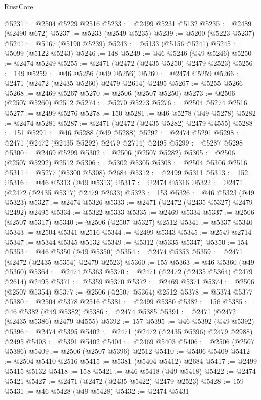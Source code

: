 \begin{lexlean}{RustCore}
\begin{coremodule}
@5231 := @2504 @5229 @2516
@5233 := @2499 @5231 @5132
@5235 := @2489 (@2490 @672)
@5237 := @5233 (@2549 @5235)
@5239 := @5200 (@5223 @5237)
@5241 := @5167 (@5190 @5239)
@5243 := @5133 (@5156 @5241)
@5245 := @5099 (@5122 @5243)
@5246 := 148
@5249 := @46 @5246 (@49 @5246)
@5250 := @2474 @5249
@5255 := @2471 (@2472 (@2435 @5250) @2479 @2523)
@5256 := 149
@5259 := @46 @5256 (@49 @5256)
@5260 := @2474 @5259
@5266 := @2471 (@2472 (@2435 @5260) @2479 @2614) @2495
@5267 := @5255 @5266
@5268 := @2469 @5267
@5270 := @2506 (@2507 @5250)
@5273 := @2506 (@2507 @5260) @2512
@5274 := @5270 @5273
@5276 := @2504 @5274 @2516
@5277 := @2499 @5276
@5278 := 150
@5281 := @46 @5278 (@49 @5278)
@5282 := @2474 @5281
@5287 := @2471 (@2472 (@2435 @5282) @2479 @4555)
@5288 := 151
@5291 := @46 @5288 (@49 @5288)
@5292 := @2474 @5291
@5298 := @2471 (@2472 (@2435 @5292) @2479 @2714) @2495
@5299 := @5287 @5298
@5300 := @2469 @5299
@5302 := @2506 (@2507 @5282)
@5305 := @2506 (@2507 @5292) @2512
@5306 := @5302 @5305
@5308 := @2504 @5306 @2516
@5311 := @5277 (@5300 @5308) @2684
@5312 := @2499 @5311
@5313 := 152
@5316 := @46 @5313 (@49 @5313)
@5317 := @2474 @5316
@5322 := @2471 (@2472 (@2435 @5317) @2479 @2633)
@5323 := 153
@5326 := @46 @5323 (@49 @5323)
@5327 := @2474 @5326
@5333 := @2471 (@2472 (@2435 @5327) @2479 @2492) @2495
@5334 := @5322 @5333
@5335 := @2469 @5334
@5337 := @2506 (@2507 @5317)
@5340 := @2506 (@2507 @5327) @2512
@5341 := @5337 @5340
@5343 := @2504 @5341 @2516
@5344 := @2499 @5343
@5345 := @2549 @2714
@5347 := @5344 @5345 @5132
@5349 := @5312 (@5335 @5347)
@5350 := 154
@5353 := @46 @5350 (@49 @5350)
@5354 := @2474 @5353
@5359 := @2471 (@2472 (@2435 @5354) @2479 @2523)
@5360 := 155
@5363 := @46 @5360 (@49 @5360)
@5364 := @2474 @5363
@5370 := @2471 (@2472 (@2435 @5364) @2479 @2614) @2495
@5371 := @5359 @5370
@5372 := @2469 @5371
@5374 := @2506 (@2507 @5354)
@5377 := @2506 (@2507 @5364) @2512
@5378 := @5374 @5377
@5380 := @2504 @5378 @2516
@5381 := @2499 @5380
@5382 := 156
@5385 := @46 @5382 (@49 @5382)
@5386 := @2474 @5385
@5391 := @2471 (@2472 (@2435 @5386) @2479 @4555)
@5392 := 157
@5395 := @46 @5392 (@49 @5392)
@5396 := @2474 @5395
@5402 := @2471 (@2472 (@2435 @5396) @2479 @2988) @2495
@5403 := @5391 @5402
@5404 := @2469 @5403
@5406 := @2506 (@2507 @5386)
@5409 := @2506 (@2507 @5396) @2512
@5410 := @5406 @5409
@5412 := @2504 @5410 @2516
@5415 := @5381 (@5404 @5412) @2684
@5417 := @2499 @5415 @5132
@5418 := 158
@5421 := @46 @5418 (@49 @5418)
@5422 := @2474 @5421
@5427 := @2471 (@2472 (@2435 @5422) @2479 @2523)
@5428 := 159
@5431 := @46 @5428 (@49 @5428)
@5432 := @2474 @5431

\end{coremodule}
\end{lexlean}
